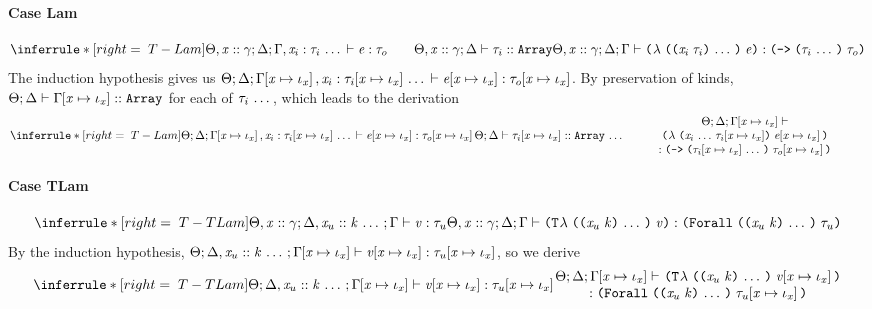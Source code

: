 \begin{sproof}
  \paragraph{Case {\sc Lam}}
  \[{\infr[T-Lam]
    {\typeof{\sEnv, \hassort{\var}{\sort}}{\kEnv}
      {\tEnv, \sequence{\hastype{\var_i}{\type_i}}}
      {\expr}{\type_o}
      \qquad \kindof{\sEnv, \hassort{\var}{\sort}}{\kEnv}
             {\type_i}{\kindarray}}
    {\typeof{\sEnv, \hassort{\var}{\sort}}{\kEnv}{\tEnv}
      {\lam{\sequence{\notevar{\var_i}{\type_i}}}{\expr}}
      {\typefun{\sequence{\type_i}}{\type_o}}}}\]
  The induction hypothesis gives us
  $\Theta;\Delta;\Gamma\hspace{-2pt}\left[ \mathit{x} \mapsto \mathit{\iota}_{\mathit{x}} \right], \mathit{x}_i : \mathit{\tau}_i\hspace{-2pt}\left[ \mathit{x} \mapsto \mathit{\iota}_{\mathit{x}} \right] \, \ldots \, \vdash \mathit{e}\hspace{-2pt}\left[ \mathit{x} \mapsto \mathit{\iota}_{\mathit{x}} \right] : \mathit{\tau}_o\hspace{-2pt}\left[ \mathit{x} \mapsto \mathit{\iota}_{\mathit{x}} \right]$.
  By preservation of kinds,
  $\Theta;\Delta \vdash \Gamma\hspace{-2pt}\left[ \mathit{x} \mapsto \mathit{\iota}_{\mathit{x}} \right] :: \text{\tt Array}$
  for each of $\mathit{\tau}_i \, \ldots \,$,
  which leads to the derivation
  \[{\infr[T-Lam]
    {\typeof{\sEnv}{\kEnv}
      {\idxsubst{\tEnv}, \sequence{\hastype{\var_i}{\idxsubst{\type_i}}}}
      {\idxsubst{\expr}}{\idxsubst{\type_o}}
      \\\\ \sequence{\kindof{\sEnv}{\kEnv}
        {\idxsubst{\type_i}}{\kindarray}}}
    {\parbox{0.6\textwidth}
      {\centering
        \({\sEnv};{\kEnv};{\idxsubst{\tEnv}}\vdash\)
        \({\lam{\sequence{\var_i}{\idxsubst{\type_i}}}{\idxsubst{\expr}}}\)
        \(:{\typefun{\sequence{\idxsubst{\type_i}}}{\idxsubst{\type_o}}}\)}}}\]
  \paragraph{Case {\sc TLam}}
  \[{\infr[T-TLam]
    {\typeof{\sEnv, \hassort{\var}{\sort}}
      {\kEnv, \sequence{\haskind{\var_u}{\kind}}}{\tEnv}
      {\val}{\type_u}}
    {\typeof{\sEnv, \hassort{\var}{\sort}}{\kEnv}{\tEnv}
      {\tlam{\sequence{\notevar{\var_u}{\kind}}}{\val}}
      {\typeuniv{\sequence{\notevar{\var_u}{\kind}}}{\type_u}}}}\]
  By the induction hypothesis,
  $\Theta;\Delta, \mathit{x}_u :: \mathit{k} \, \ldots \,;\Gamma\hspace{-2pt}\left[ \mathit{x} \mapsto \mathit{\iota}_{\mathit{x}} \right] \vdash \mathit{v}\hspace{-2pt}\left[ \mathit{x} \mapsto \mathit{\iota}_{\mathit{x}} \right] : \mathit{\tau}_u\hspace{-2pt}\left[ \mathit{x} \mapsto \mathit{\iota}_{\mathit{x}} \right]$,
  so we derive
  \[{\infr[T-TLam]
    {\typeof{\sEnv}
      {\kEnv, \sequence{\haskind{\var_u}{\kind}}}
      {\idxsubst{\tEnv}}
      {\idxsubst{\val}}{\idxsubst{\type_u}}}
    {\parbox{0.6\textwidth}
      {\centering
        \({\sEnv};{\kEnv};{\idxsubst{\tEnv}}\vdash\)
        \({\tlam{\sequence{\notevar{\var_u}{\kind}}}{\idxsubst{\val}}}\)
        \(:{\typeuniv{\sequence{\notevar{\var_u}{\kind}}}{\idxsubst{\type_u}}}\)}}}\]

\end{sproof}
